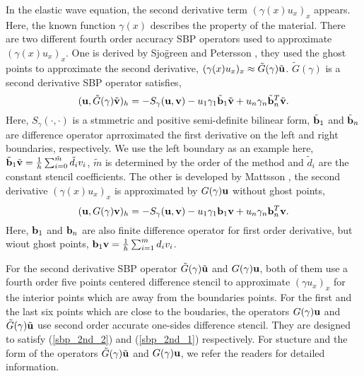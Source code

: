 \documentclass[a4paper]{article}
\begin{document}
In the elastic wave equation, the second derivative term $(\gamma(x)u_x)_x$ appears. Here, the known function $\gamma(x)$ describes the property of the material. There are two different fourth order accuracy SBP operators used to approximate $(\gamma(x)u_x)_x$. One is derived by Sjo\"green and Petersson \cite{?}, they used the ghost points to approximate the second derivative, $ (\gamma(x)u_x)_x \approx \tilde{G}(\gamma)\tilde{\bf u}$. $\tilde{G}(\gamma)$ is a second derivative SBP operator satisfies,
\begin{equation}\label{sbp_2nd_1}
({\bf u}, \tilde{G}(\gamma)\tilde{\bf v})_h = -S_\gamma({\bf u},{\bf v})-u_1\gamma_1\tilde{\bf b}_1\tilde{\bf v} + u_n\gamma_n\tilde{\bf b}_n^T\tilde{\bf v}.
\end{equation}
Here, $S_\gamma(\cdot,\cdot)$ is a stmmetric and positive semi-definite bilinear form, $\tilde{\bf b}_1$ and $\tilde{\bf b}_n$ are difference operator aprroximated the first derivative on the left and right boundaries, respectively. We use the left boundary as an example here, $\tilde{\bf b}_1 \tilde{\bf v} = \frac{1}{h}\sum_{i=0}^{\tilde{m}} \tilde{d}_iv_i$, $\tilde{m}$ is determined by the order of the method and $\tilde{d}_i$ are the constant stencil coefficients. The other is developed by Mattsson \cite{?}, the second derivative $(\gamma(x)u_x)_x$ is approximated by $G(\gamma){\bf u}$ without ghost points,
\begin{equation}\label{sbp_2nd_2}
({\bf u}, G(\gamma){\bf v})_h = -S_\gamma({\bf u},{\bf v})-u_1\gamma_1{\bf b}_1{\bf v} + u_n\gamma_n{\bf b}_n^T{\bf v}.
\end{equation}
Here, ${\bf b}_1$ and ${\bf b}_n$ are also finite difference operator for first order derivative, but wiout ghost points, ${\bf b}_1 {\bf v} = \frac{1}{h}\sum_{i=1}^{m} d_i v_i$. 

For the second derivative SBP operator $\tilde{G}(\gamma)\tilde {\bf u}$ and $G(\gamma){\bf u}$, both of them use a fourth order five points centered difference stencil to approximate $(\gamma u_x)_x$ for the interior points which are away from the boundaries points. For the first and the last six points which are close to the boudaries, the operators $G(\gamma){\bf u}$ and $\tilde{G}(\gamma)\tilde{\bf{u}}$ use second order accurate one-sides difference stencil. They are designed to satisfy (\ref{sbp_2nd_2}) and (\ref{sbp_2nd_1}) respectively. For stucture and the form of the operators $\tilde{G}(\gamma)\tilde {\bf u}$ and $G(\gamma){\bf u}$, we refer the readers \cite{???} for detailed information.
\end{document}
